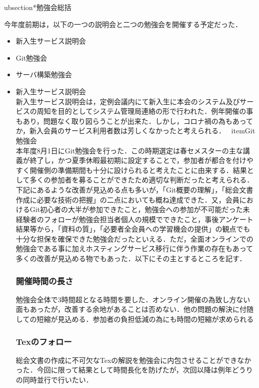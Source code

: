 ubsection*{勉強会総括}


今年度前期は，以下の一つの説明会と二つの勉強会を開催する予定だった．
\begin{itemize}
	\item 新入生サービス説明会
	\item Git勉強会
	\item サーバ構築勉強会
\end{itemize}

\begin{itemize}
\\\\
	\item{新入生サービス説明会}
\\新入生サービス説明会は，定例会議内にて新入生に本会のシステム及びサービスの周知を目的としてシステム管理局連絡の形で行われた．例年開催の事もあり，問題なく取り図らうことが出来た．しかし，コロナ禍の為もあってか，新入会員のサービス利用者数は芳しくなかったと考えられる．
	\ item{Git勉強会}
\\本年度8月1日にGit勉強会を行った．この時期選定は春セメスターの主な講義が終了し，かつ夏季休暇最初期に設定することで，参加者が都合を付けやすく開催側の準備期間も十分に設けられると考えたことに由来する．結果として多くの参加者を募ることができたため適切な判断だったと考えられる．下記にあるような改善が見込める点も多いが，「Git概要の理解」，「総会文書作成に必要な技術の把握」の二点においても概ね達成できた．又，会員におけるGit初心者の大半が参加できたこと，勉強会への参加が不可能だった未経験者のフォローが勉強会担当者個人の規模でできたこと，事後アンケート結果等から，「資料の質」，「必要者全会員への学習機会の提供」の観点でも十分な担保を確保できた勉強会だったといえる．ただ，全面オンラインでの勉強会である事に加えホスティングサービス移行に伴う作業の存在もあって多くの改善が見込める物でもあった．以下にその主とするところを記す．
\subsubsection*{開催時間の長さ}
勉強会全体で3時間超となる時間を要した．オンライン開催の為致し方ない面もあったが，改善する余地があることは否めない．他の問題の解決に付随しての短縮が見込める．参加者の負担低減の為にも時間の短縮が求められる
\subsubsection*{Texのフォロー}
総会文書の作成に不可欠なTexの解説を勉強会に内包させることができなかった．今回に限って結果として時間長化を防げたが，次回以降は例年どうりの同時並行で行いたい．

\end{itemize}
